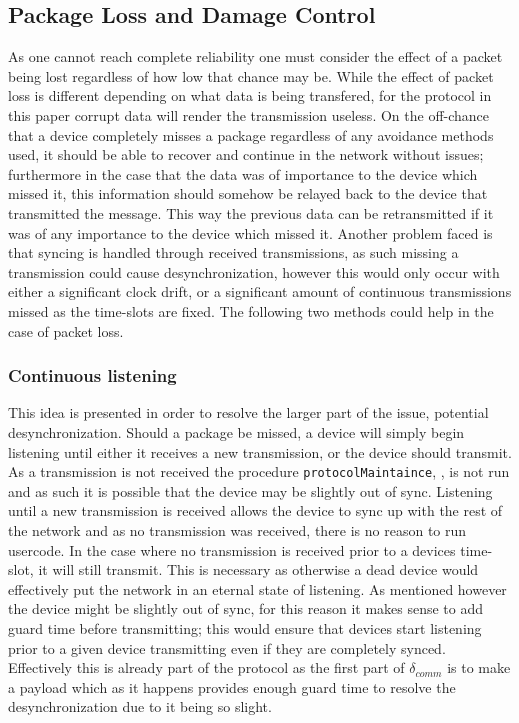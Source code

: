 \subsection{Package Loss and Damage Control}
As one cannot reach complete reliability one must consider the effect of a packet being lost regardless of how low that chance may be.
While the effect of packet loss is different depending on what data is being transfered, for the protocol in this paper corrupt data will render the transmission useless.
On the off-chance that a device completely misses a package regardless of any avoidance methods used, it should be able to recover and continue in the network without issues; furthermore in the case that the data was of importance to the device which missed it, this information should somehow be relayed back to the device that transmitted the message.
This way the previous data can be retransmitted if it was of any importance to the device which missed it.
Another problem faced is that syncing is handled through received transmissions, as such missing a transmission could cause desynchronization, however this would only occur with either a significant clock drift, or a significant amount of continuous transmissions missed as the time-slots are fixed.
The following two methods could help in the case of packet loss.

\subsubsection*{Continuous listening}\label{contListen}
This idea is presented in order to resolve the larger part of the issue, potential desynchronization.
Should a package be missed, a device will simply begin listening until either it receives a new transmission, or the device should transmit.
As a transmission is not received the procedure \texttt{protocolMaintaince}, , is not run and as such it is possible that the device may be slightly out of sync.
Listening until a new transmission is received allows the device to sync up with the rest of the network and as no transmission was received, there is no reason to run usercode.
In the case where no transmission is received prior to a devices time-slot, it will still transmit.
This is necessary as otherwise a dead device would effectively put the network in an eternal state of listening.
As mentioned however the device might be slightly out of sync, for this reason it makes sense to add guard time before transmitting; this would ensure that devices start listening prior to a given device transmitting even if they are completely synced.
Effectively this is already part of the protocol as the first part of $\delta_{comm}$ is to make a payload which as it happens provides enough guard time to resolve the desynchronization due to it being so slight.


